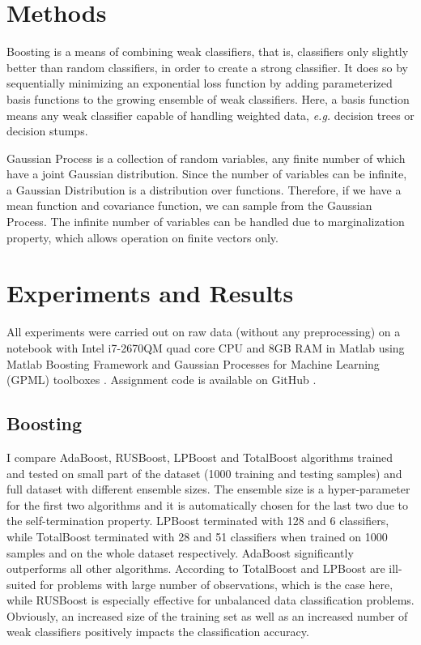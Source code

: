 \documentclass[journal, a4paper]{IEEEtran}
\begin{document}
\section{Methods}
    Boosting is a means of combining weak classifiers, that is, classifiers only slightly better than random classifiers, in order to create a strong classifier. It does so by sequentially minimizing an exponential loss function by adding parameterized basis functions to the growing ensemble of weak classifiers. Here, a basis function means any weak classifier capable of handling weighted data, \textit{e.g.} decision trees or decision stumps.
    
    Gaussian Process is a collection of random variables, any finite number of which have a joint Gaussian distribution. Since the number of variables can be infinite, a Gaussian Distribution is a distribution over functions. Therefore, if we have a mean function and covariance function, we can sample from the Gaussian Process. The infinite number of variables can be handled due to marginalization property, which allows operation on finite vectors only.

\section {Experiments and Results}
  All experiments were carried out on raw data (without any preprocessing) on a notebook with Intel i7-2670QM quad core CPU and 8GB RAM in Matlab using Matlab Boosting Framework \cite{MATLAB_BOOST} and Gaussian Processes for Machine Learning (GPML) toolboxes \cite{GPML}. Assignment code is available on GitHub \cite{code}.
  
  \subsection{Boosting}
      I compare AdaBoost, RUSBoost, LPBoost and TotalBoost algorithms trained and tested on small part of the dataset (1000 training and testing samples) and full dataset with different ensemble sizes. The ensemble size is a hyper-parameter for the first two algorithms and it is automatically chosen for the last two due to the self-termination property. LPBoost terminated with 128 and 6 classifiers, while TotalBoost terminated with 28 and 51 classifiers when trained on 1000 samples and on the whole dataset respectively. AdaBoost significantly outperforms all other algorithms. According to \cite{MATLAB_BOOST} TotalBoost and LPBoost are ill-suited for problems with large number of observations, which is the case here, while RUSBoost is especially effective for unbalanced data classification problems. Obviously, an increased size of the training set as well as an increased number of weak classifiers positively impacts the classification accuracy.
  
\end{document}
